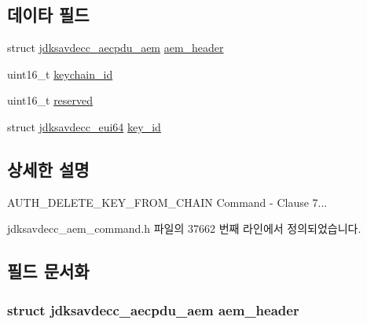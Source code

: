 \subsection*{데이타 필드}
\begin{DoxyCompactItemize}
\item 
struct \hyperlink{structjdksavdecc__aecpdu__aem}{jdksavdecc\+\_\+aecpdu\+\_\+aem} \hyperlink{structjdksavdecc__aem__command__auth__delete__key__from__chain_ae1e77ccb75ff5021ad923221eab38294}{aem\+\_\+header}
\item 
uint16\+\_\+t \hyperlink{structjdksavdecc__aem__command__auth__delete__key__from__chain_a10ed6547e01665c453e2a40b142f7526}{keychain\+\_\+id}
\item 
uint16\+\_\+t \hyperlink{structjdksavdecc__aem__command__auth__delete__key__from__chain_a5a6ed8c04a3db86066924b1a1bf4dad3}{reserved}
\item 
struct \hyperlink{structjdksavdecc__eui64}{jdksavdecc\+\_\+eui64} \hyperlink{structjdksavdecc__aem__command__auth__delete__key__from__chain_a37cbdf6056556ccfaee3ab01dc7c3032}{key\+\_\+id}
\end{DoxyCompactItemize}


\subsection{상세한 설명}
A\+U\+T\+H\+\_\+\+D\+E\+L\+E\+T\+E\+\_\+\+K\+E\+Y\+\_\+\+F\+R\+O\+M\+\_\+\+C\+H\+A\+IN Command -\/ Clause 7... 

jdksavdecc\+\_\+aem\+\_\+command.\+h 파일의 37662 번째 라인에서 정의되었습니다.



\subsection{필드 문서화}
\subsubsection[{\texorpdfstring{aem\+\_\+header}{aem_header}}]{\setlength{\rightskip}{0pt plus 5cm}struct {\bf jdksavdecc\+\_\+aecpdu\+\_\+aem} aem\+\_\+header}\hypertarget{structjdksavdecc__aem__command__auth__delete__key__from__chain_ae1e77ccb75ff5021ad923221eab38294}{}\label{structjdksavdecc__aem__command__auth__delete__key__from__chain_ae1e77ccb75ff5021ad923221eab38294}


